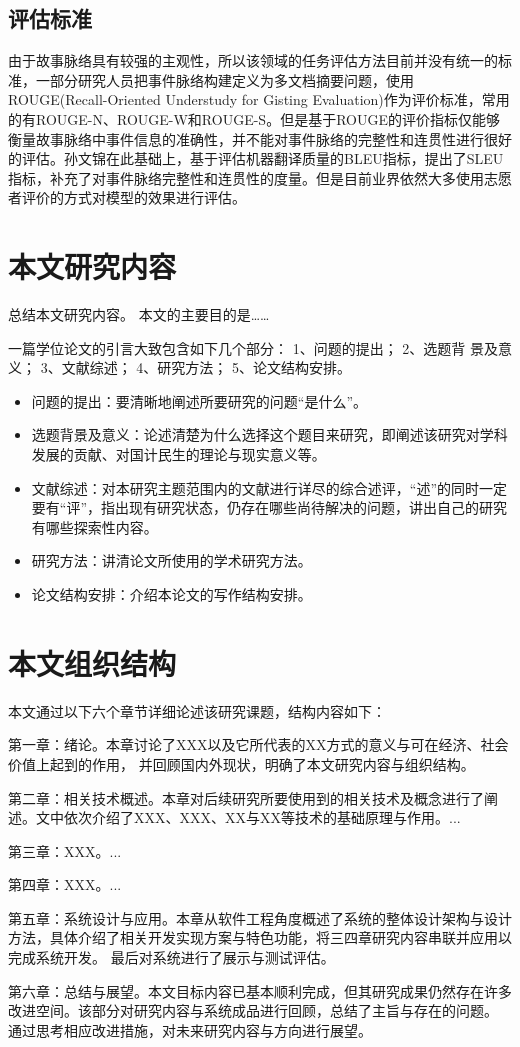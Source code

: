 \subsection{评估标准}

由于故事脉络具有较强的主观性，所以该领域的任务评估方法目前并没有统一的标准，一部分研究人员把事件脉络构建定义为多文档摘要问题，使用ROUGE(Recall-Oriented Understudy for Gisting Evaluation)\cite{EvaMetrics-Li, EvaMetrics-bruggermann}作为评价标准，常用的有ROUGE-N、ROUGE-W和ROUGE-S。但是基于ROUGE的评价指标仅能够衡量故事脉络中事件信息的准确性，并不能对事件脉络的完整性和连贯性进行很好的评估。孙文锦\cite{EvaMetrics-Sun}在此基础上，基于评估机器翻译质量的BLEU指标，提出了SLEU指标，补充了对事件脉络完整性和连贯性的度量。但是目前业界依然大多使用志愿者评价的方式对模型的效果进行评估。

\section{本文研究内容}

总结本文研究内容。
本文的主要目的是……

一篇学位论文的引言大致包含如下几个部分：
1、问题的提出；
2、选题背 景及意义；
3、文献综述；
4、研究方法；
5、论文结构安排。
\begin{itemize}
  \item 问题的提出：要清晰地阐述所要研究的问题“是什么”。
  \item 选题背景及意义：论述清楚为什么选择这个题目来研究，即阐述该研究对学科发展的贡献、对国计民生的理论与现实意义等。
  \item 文献综述：对本研究主题范围内的文献进行详尽的综合述评，“述”的同时一定要有“评”，指出现有研究状态，仍存在哪些尚待解决的问题，讲出自己的研究有哪些探索性内容。
  \item 研究方法：讲清论文所使用的学术研究方法。
  \item 论文结构安排：介绍本论文的写作结构安排。
\end{itemize}

\section{本文组织结构}

本文通过以下六个章节详细论述该研究课题，结构内容如下：

第一章：绪论。本章讨论了XXX以及它所代表的XX方式的意义与可在经济、社会价值上起到的作用，
并回顾国内外现状，明确了本文研究内容与组织结构。

第二章：相关技术概述。本章对后续研究所要使用到的相关技术及概念进行了阐述。文中依次介绍了XXX、XXX、XX与XX等技术的基础原理与作用。...

第三章：XXX。...

第四章：XXX。...

第五章：系统设计与应用。本章从软件工程角度概述了系统的整体设计架构与设计方法，具体介绍了相关开发实现方案与特色功能，将三四章研究内容串联并应用以完成系统开发。
最后对系统进行了展示与测试评估。

第六章：总结与展望。本文目标内容已基本顺利完成，但其研究成果仍然存在许多改进空间。该部分对研究内容与系统成品进行回顾，总结了主旨与存在的问题。
通过思考相应改进措施，对未来研究内容与方向进行展望。
